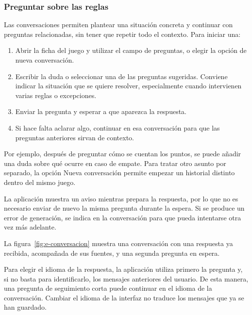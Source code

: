 
\subsubsection{Preguntar sobre las reglas}

Las conversaciones permiten plantear una situación concreta y continuar
con preguntas relacionadas, sin tener que repetir todo el contexto. Para
iniciar una:

\begin{enumerate}
    \item Abrir la ficha del juego y utilizar el campo de preguntas, o
    elegir la opción de nueva conversación.
    \item Escribir la duda o seleccionar una de las preguntas sugeridas.
    Conviene indicar la situación que se quiere resolver, especialmente
    cuando intervienen varias reglas o excepciones.
    \item Enviar la pregunta y esperar a que aparezca la respuesta.
    \item Si hace falta aclarar algo, continuar en esa conversación para
    que las preguntas anteriores sirvan de contexto.
\end{enumerate}

Por ejemplo, después de preguntar cómo se cuentan los puntos, se puede
añadir una duda sobre qué ocurre en caso de empate. Para tratar otro asunto
por separado, la opción \guillemotleft{}Nueva conversación\guillemotright{}
permite empezar un historial distinto dentro del mismo juego.

La aplicación muestra un aviso mientras prepara la respuesta, por lo que
no es necesario enviar de nuevo la misma pregunta durante la espera. Si
se produce un error de generación, se indica en la conversación para que
pueda intentarse otra vez más adelante.

La figura~\ref{fig:e-conversacion} muestra una conversación con una
respuesta ya recibida, acompañada de sus fuentes, y una segunda pregunta
en espera.


Para elegir el idioma de la respuesta, la aplicación utiliza primero la
pregunta y, si no basta para identificarlo, los mensajes anteriores del
usuario. De esta manera, una pregunta de seguimiento corta puede continuar
en el idioma de la conversación. Cambiar el idioma de la interfaz no
traduce los mensajes que ya se han guardado.


